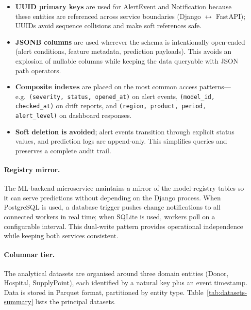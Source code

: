 \begin{itemize}
\item \textbf{UUID primary keys} are used for AlertEvent and Notification
      because these entities are referenced across service boundaries
      (Django $\leftrightarrow$ FastAPI); UUIDs avoid sequence collisions
      and make soft references safe.
\item \textbf{JSONB columns} are used wherever the schema is intentionally
      open-ended (alert conditions, feature metadata, prediction
      payloads).  This avoids an explosion of nullable columns while
      keeping the data queryable with JSON path operators.
\item \textbf{Composite indexes} are placed on the most common access
      patterns—e.g.\ \texttt{(severity, status, opened\_at)} on
      alert events, \texttt{(model\_id, checked\_at)} on drift reports,
      and \texttt{(region, product, period, alert\_level)} on dashboard
      responses.
\item \textbf{Soft deletion is avoided}; alert events transition through
      explicit status values, and prediction logs are append-only.  This
      simplifies queries and preserves a complete audit trail.
\end{itemize}

\paragraph{Registry mirror.}

The ML-backend microservice maintains a mirror of the model-registry
tables so it can serve predictions without depending on the Django
process.  When PostgreSQL is used, a database trigger pushes change
notifications to all connected workers in real time; when SQLite is used,
workers poll on a configurable interval.  This dual-write pattern provides
operational independence while keeping both services consistent.

\paragraph{Columnar tier.}

The analytical datasets are organised around three domain entities (Donor,
Hospital, SupplyPoint), each identified by a natural key plus an event
timestamp.  Data is stored in Parquet format, partitioned by entity type.
Table~\ref{tab:datasets-summary} lists the principal datasets.

